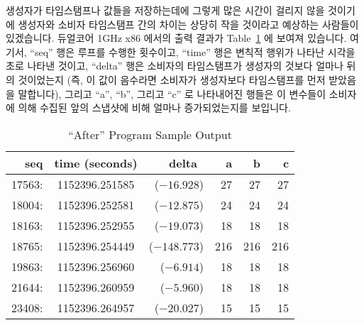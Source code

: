 생성자가 타임스탬프나 값들을 저장하는데에 그렇게 많은 시간이 걸리지 않을
것이기에 생성자와 소비자 타임스탬프 간의 차이는 상당히 작을 것이라고 예상하는
사람들이 있겠습니다.
듀얼코어 1GHz x86 에서의 출력 결과가
Table~\ref{tab:app:questions:After Program Sample Output} 에 보여져 있습니다.
여기서, ``seq'' 행은 루프를 수행한 횟수이고, ``time'' 행은 변칙적 행위가 나타난
시각을 초로 나타낸 것이고, ``delta'' 행은 소비자의 타임스탬프가 생성자의 것보다
얼마나 뒤의 것이었는지 (즉, 이 값이 음수라면 소비자가 생성자보다 타임스탬프를
먼저 받았음을 말합니다), 그리고 ``a'', ``b'', 그리고 ``c'' 로 나타내어진 행들은
이 변수들이 소비자에 의해 수집된 앞의 스냅샷에 비해 얼마나 증가되었는지를
보입니다.
\iffalse

One might intuitively expect that the difference between the producer
and consumer timestamps would be quite small, as it should not take
much time for the producer to record the timestamps or the values.
An excerpt of some sample output on a dual-core 1\,GHz x86 is shown in
Table~\ref{tab:app:questions:After Program Sample Output}.
Here, the ``seq'' column is the number of times through the loop,
the ``time'' column is the time of the anomaly in seconds, the ``delta''
column is the number of seconds the consumer's timestamp follows that
of the producer (where a negative value indicates that the consumer
has collected its timestamp before the producer did), and the
columns labelled ``a'', ``b'', and ``c'' show the amount that these
variables increased since the prior snapshot collected by the consumer.
\fi

\begin{table}[htbp]
\centering
\scriptsize
\begin{tabular}{rcrrrr}
seq    & time (seconds) & delta~    &  a &  b &  c \\
\hline
17563: & 1152396.251585 & ($-16.928$) & 27 & 27 & 27 \\
18004: & 1152396.252581 & ($-12.875$) & 24 & 24 & 24 \\
18163: & 1152396.252955 & ($-19.073$) & 18 & 18 & 18 \\
18765: & 1152396.254449 & ($-148.773$) & 216 & 216 & 216 \\
19863: & 1152396.256960 & ($-6.914$) & 18 & 18 & 18 \\
21644: & 1152396.260959 & ($-5.960$) & 18 & 18 & 18 \\
23408: & 1152396.264957 & ($-20.027$) & 15 & 15 & 15 \\
\end{tabular}
\caption{``After'' Program Sample Output}
\label{tab:app:questions:After Program Sample Output}
\end{table}

